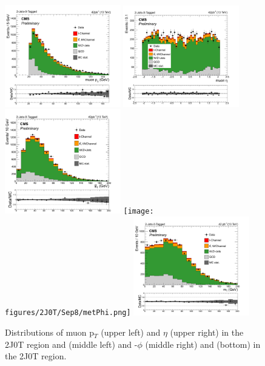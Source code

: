 \begin{figure}[hbpt]
\begin{center}
\includegraphics[width=0.45\textwidth,height=0.4\textwidth]{figures/2J0T/Sep8/muPt.png}
\includegraphics[width=0.45\textwidth,height=0.4\textwidth]{figures/2J0T/Sep8/muEta.png}
\includegraphics[width=0.45\textwidth,height=0.4\textwidth]{figures/2J0T/Sep8/metPt.png}
\texttt{[image: figures/2J0T/Sep8/metPhi.png]}
\includegraphics[width=0.45\textwidth,height=0.4\textwidth]{figures/2J0T/Sep8/mtW.png}\hfill
\caption{\label{fig:Mu_MET_2J0T} Distributions of muon p$_{T}$ (upper left) and $\eta$ (upper right) in the 2J0T region and \met (middle left) and \met-$\phi$ (middle right) and \mT (bottom) in the 2J0T region.}
\end{center}
\end{figure}





